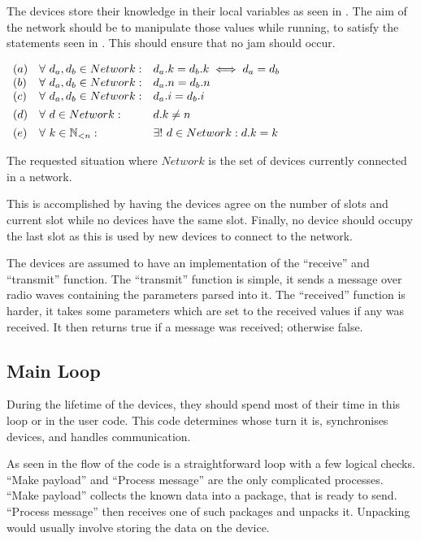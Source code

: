 The devices store their knowledge in their local variables as seen in . 
The aim of the network should be to manipulate those values while running, to satisfy the statements seen in . 
This should ensure that no jam should occur.

\begin{table}[H]
	\centering
	$\begin{array}{l l l}
        (a)&\forall\ d_a, d_b \in Network: & d_a.k = d_b.k  \iff d_a=d_b\\
		(b)&\forall\ d_a, d_b \in Network: & d_a.n = d_b.n \\
		(c)&\forall\ d_a, d_b \in Network: & d_a.i = d_b.i \\[1ex]
		(d)&\forall\ d \in Network: & d.k \neq n \\[1ex]
		(e)&\forall\ k \in \mathbb{N}_{<n}: & \exists!\ d \in Network: d.k = k 
	\end{array}$
	\caption{The requested situation where $Network$ is the set of devices currently connected in a network.}
    \label{tab:invariants}
\end{table}

This is accomplished by having the devices agree on the number of slots and current slot while no devices have the same slot. 
Finally, no device should occupy the last slot as this is used by new devices to connect to the network.

The devices are assumed to have an implementation of the \enquote{receive} and \enquote{transmit} function.
The \enquote{transmit} function is simple, it sends a message over radio waves containing the parameters parsed into it.
The \enquote{received} function is harder, it takes some parameters which are set to the received values if any was received. 
It then returns true if a message was received; otherwise false.
                    
\subsection{Main Loop} %
\label{sub:general_case}

During the lifetime of the devices, they should spend most of their time in this loop or in the user code. 
This code determines whose turn it is, synchronises devices, and handles communication.

As seen in  the flow of the code is a straightforward loop with a few logical checks. 
\enquote{Make payload} and \enquote{Process message} are the only complicated processes. 
\enquote{Make payload} collects the known data into a package, that is ready to send. 
\enquote{Process message} then receives one of such packages and unpacks it. 
Unpacking would usually involve storing the data on the device.

